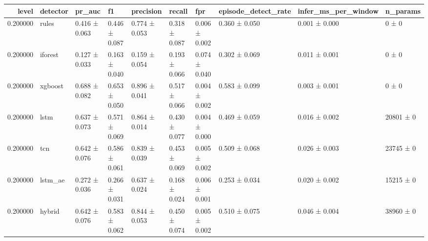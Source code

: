 \begin{tabular}{rlllllllll}
\toprule
level & detector & pr\_auc & f1 & precision & recall & fpr & episode\_detect\_rate & infer\_ms\_per\_window & n\_params \\
\midrule
0.200000 & rules & 0.416 ± 0.063 & 0.446 ± 0.087 & 0.774 ± 0.053 & 0.318 ± 0.087 & 0.006 ± 0.002 & 0.360 ± 0.050 & 0.001 ± 0.000 & 0 ± 0 \\
0.200000 & iforest & 0.127 ± 0.033 & 0.163 ± 0.040 & 0.159 ± 0.054 & 0.193 ± 0.066 & 0.074 ± 0.040 & 0.302 ± 0.069 & 0.011 ± 0.001 & 0 ± 0 \\
0.200000 & xgboost & 0.688 ± 0.082 & 0.653 ± 0.050 & 0.896 ± 0.041 & 0.517 ± 0.066 & 0.004 ± 0.002 & 0.583 ± 0.099 & 0.003 ± 0.001 & 0 ± 0 \\
0.200000 & lstm & 0.637 ± 0.073 & 0.571 ± 0.069 & 0.864 ± 0.014 & 0.430 ± 0.077 & 0.004 ± 0.000 & 0.469 ± 0.059 & 0.016 ± 0.002 & 20801 ± 0 \\
0.200000 & tcn & 0.642 ± 0.076 & 0.586 ± 0.061 & 0.839 ± 0.039 & 0.453 ± 0.069 & 0.005 ± 0.002 & 0.509 ± 0.068 & 0.026 ± 0.003 & 23745 ± 0 \\
0.200000 & lstm\_ae & 0.272 ± 0.036 & 0.266 ± 0.031 & 0.637 ± 0.024 & 0.168 ± 0.024 & 0.006 ± 0.001 & 0.253 ± 0.034 & 0.020 ± 0.002 & 15215 ± 0 \\
0.200000 & hybrid & 0.642 ± 0.076 & 0.583 ± 0.062 & 0.844 ± 0.053 & 0.450 ± 0.074 & 0.005 ± 0.002 & 0.510 ± 0.075 & 0.046 ± 0.004 & 38960 ± 0 \\
\bottomrule
\end{tabular}
